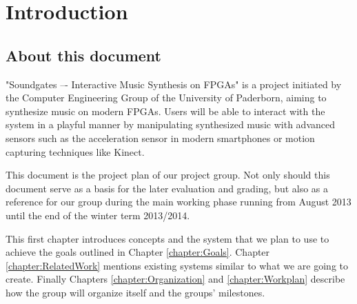 \chapter{Introduction}
	\label{chapter:Introduction}
	\section{About this document}
	
"Soundgates –- Interactive Music Synthesis on \ac{FPGA}s" is a project initiated by the Computer Engineering Group of the University of Paderborn, aiming to synthesize music on modern \ac{FPGA}s. Users will be able to interact with the system in a playful manner by manipulating synthesized music with advanced sensors such as the acceleration sensor in modern smartphones or motion capturing techniques like Kinect.


This document is the project plan of our project group.
Not only should this document serve as a basis for the later evaluation and grading, 
but also as a reference for our group during the main working phase running from August 2013 until the end of the winter term 2013/2014. %

This first chapter introduces concepts and the system that we plan to use to achieve the goals outlined in Chapter \ref{chapter:Goals}. 
Chapter \ref{chapter:RelatedWork} mentions existing systems similar to what we are going to create.
Finally Chapters \ref{chapter:Organization} and \ref{chapter:Workplan} describe how the group will organize itself and the groups' milestones.

	 
